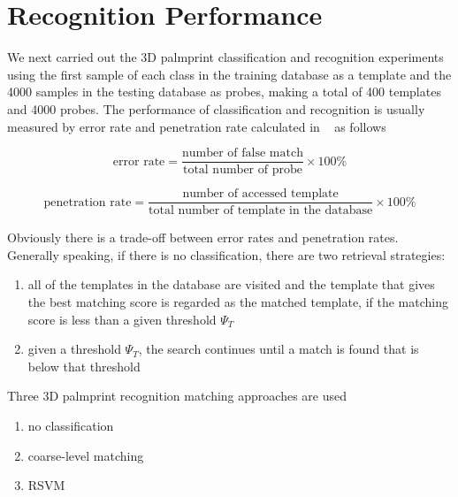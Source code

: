 \section{Recognition Performance}
\label{sec:experiment:recognition}

We next carried out the 3D palmprint classification and recognition experiments using the first sample of each class in the training database as a template and the 4000 samples in the testing database as probes, making a total of 400 templates and 4000 probes. The performance of classification and recognition is usually measured by error rate and penetration rate calculated in ~\cite{Maltoni:wn} as follows

\begin{equation}
\text{error rate} = \frac{\text{number of false match}}{\text{total number of probe}} \times 100\%
\end{equation}

\begin{equation}
\text{penetration rate} = \frac{\text{number of accessed template}}{\text{total number of template in the database}} \times 100\%
\label{eq:experiment:prate}
\end{equation}

Obviously there is a trade-off between error rates and penetration rates. Generally speaking, if there is no classification, there are two retrieval strategies:

\begin{enumerate}
\item all of the templates in the database are visited and the template that gives the best matching score is regarded as the matched template, if the matching score is less than a given threshold $\Psi_T$
\item given a threshold $\Psi_T$, the search continues until a match is found that is below that threshold
\end{enumerate}

Three 3D palmprint recognition matching approaches are used

\begin{enumerate}
\item no classification
\item coarse-level matching
\item RSVM
\end{enumerate}

